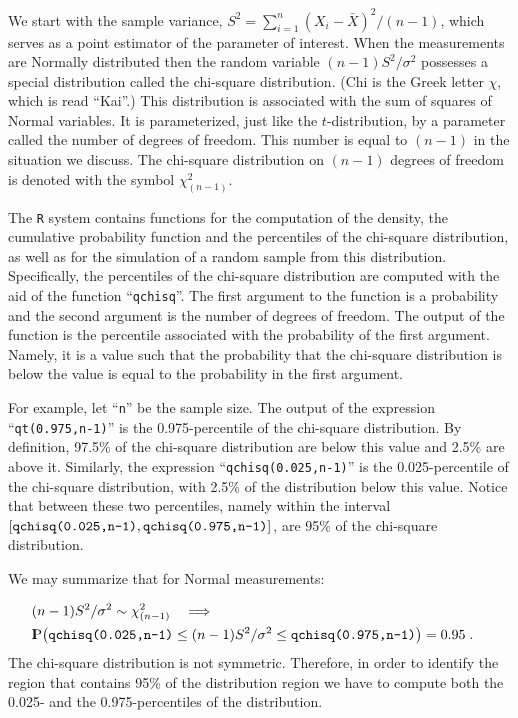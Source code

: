 \documentclass[]{krantz}
\newcommand{\Prob}{{\rm I\kern-.3em P}}
\theoremstyle{definition}
\theoremstyle{definition}
\theoremstyle{definition}
\theoremstyle{remark}
\begin{document}
We start with the sample variance,
\(S^2 = \sum_{i=1}^n (X_i - \bar X)^2/(n-1)\), which serves as a point
estimator of the parameter of interest. When the measurements are
Normally distributed then the random variable \((n-1)S^2/\sigma^2\)
possesses a special distribution called the chi-square distribution.
(Chi is the Greek letter \(\chi\), which is read ``Kai''.) This
distribution is associated with the sum of squares of Normal variables.
It is parameterized, just like the \(t\)-distribution, by a parameter
called the number of degrees of freedom. This number is equal to
\((n-1)\) in the situation we discuss. The chi-square distribution on
\((n-1)\) degrees of freedom is denoted with the symbol
\(\chi^2_{(n-1)}\).

The \texttt{R} system contains functions for the computation of the
density, the cumulative probability function and the percentiles of the
chi-square distribution, as well as for the simulation of a random
sample from this distribution. Specifically, the percentiles of the
chi-square distribution are computed with the aid of the function
``\texttt{qchisq}''. The first argument to the function is a probability
and the second argument is the number of degrees of freedom. The output
of the function is the percentile associated with the probability of the
first argument. Namely, it is a value such that the probability that the
chi-square distribution is below the value is equal to the probability
in the first argument.

For example, let ``\texttt{n}'' be the sample size. The output of the
expression ``\texttt{qt(0.975,n-1)}'' is the 0.975-percentile of the
chi-square distribution. By definition, 97.5\% of the chi-square
distribution are below this value and 2.5\% are above it. Similarly, the
expression ``\texttt{qchisq(0.025,n-1)}'' is the 0.025-percentile of the
chi-square distribution, with 2.5\% of the distribution below this
value. Notice that between these two percentiles, namely within the
interval
\([\mbox{\texttt{qchisq(0.025,n-1)}}, \mbox{\texttt{qchisq(0.975,n-1)}}]\),
are 95\% of the chi-square distribution.

We may summarize that for Normal measurements:

\[\begin{aligned}
\lefteqn{(n-1)S^2/\sigma^2 \sim \chi^2_{(n-1)} \quad \Longrightarrow }\\ & \Prob \big( \mbox{\texttt{qchisq(0.025,n-1)}} \leq (n-1)S^2/\sigma^2  \leq \mbox{\texttt{qchisq(0.975,n-1)}} \big) = 0.95\;.\end{aligned}\]
The chi-square distribution is not symmetric. Therefore, in order to
identify the region that contains 95\% of the distribution region we
have to compute both the 0.025- and the 0.975-percentiles of the
distribution.
\end{document}
